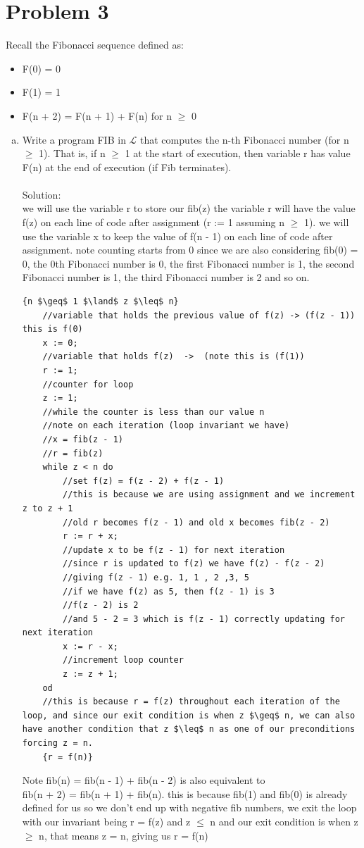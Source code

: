 \documentclass{article}
\newcommand*\moveToRight[1]{\hspace*{0em plus 1fill}\makebox{(#1)}}
\begin{document}
\section{Problem 3}
Recall the Fibonacci sequence defined as:
\begin{itemize}
    \item F(0) = 0
    \item F(1) = 1
    \item F(n + 2) = F(n + 1) + F(n) for n $\geq$ 0
\end{itemize}
    \begin{enumerate}[(a)]
        \item Write a program FIB in $\mathcal{L}$ that computes the n-th Fibonacci number (for n $\geq$ 1). That is, if n $\geq$ 1 at the start of execution, then variable r has value F(n) at the end of execution (if Fib terminates). \moveToRight{12 marks}\\\\
        Solution:\\
        we will use the variable r to store our fib(z) the variable r will have the value f(z) on each line of code after assignment (r := 1 assuming n $\geq$ 1). we will use the variable x to keep the value of f(n - 1) on each line of code after assignment. note counting starts from 0 since we are also considering fib(0) = 0, the 0th Fibonacci number is 0, the first Fibonacci number is 1, the second Fibonacci number is 1, the third Fibonacci number is 2 and so on.
        \begin{lstlisting}[language=Maple,mathescape=true]
    {n $\geq$ 1 $\land$ z $\leq$ n}
    //variable that holds the previous value of f(z) -> (f(z - 1)) this is f(0)
    x := 0;
    //variable that holds f(z)  ->  (note this is (f(1))
    r := 1;
    //counter for loop
    z := 1;
    //while the counter is less than our value n
    //note on each iteration (loop invariant we have)
    //x = fib(z - 1)
    //r = fib(z)
    while z < n do
        //set f(z) = f(z - 2) + f(z - 1)
        //this is because we are using assignment and we increment z to z + 1
        //old r becomes f(z - 1) and old x becomes fib(z - 2)
        r := r + x;
        //update x to be f(z - 1) for next iteration
        //since r is updated to f(z) we have f(z) - f(z - 2)
        //giving f(z - 1) e.g. 1, 1 , 2 ,3, 5
        //if we have f(z) as 5, then f(z - 1) is 3
        //f(z - 2) is 2
        //and 5 - 2 = 3 which is f(z - 1) correctly updating for next iteration
        x := r - x;
        //increment loop counter
        z := z + 1;
    od
    //this is because r = f(z) throughout each iteration of the loop, and since our exit condition is when z $\geq$ n, we can also have another condition that z $\leq$ n as one of our preconditions forcing z = n.
    {r = f(n)}
        \end{lstlisting}
    Note fib(n) = fib(n - 1) + fib(n - 2) is also equivalent to \\fib(n + 2) = fib(n + 1) + fib(n). this is because fib(1) and fib(0) is already defined for us so we don't end up with negative fib numbers, we exit the loop with our invariant being r = f(z) and z $\leq$ n and our exit condition is when z $\geq$ n, that means z = n, giving us r = f(n)
    

\end{enumerate}
\end{document}
